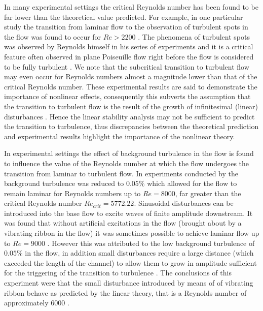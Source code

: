 \documentclass[a4paper, 12pt, twoside, openright]{article}
\numberwithin{equation}{section}
\begin{document}
In many experimental settings the critical Reynolds number has been found to be far lower than the theoretical value predicted. For example, in one particular study the transition from laminar flow to the observation of turbulent spots in the flow was found to occur for $Re>2200$ \citep{Alavyoon_etal86}. The phenomena of turbulent spots was observed by Reynolds himself in his series of experiments and it is a critical feature often observed in plane Poiseuille flow right before the flow is considered to be fully turbulent \citep{Reynolds1883}. We note that the subcritical transition to turbulent flow may even occur for Reynolds numbers almost a magnitude lower than that of the critical Reynolds number. These experimental results are said to demonstrate the importance of nonlinear effects, consequently this subverts the assumption that the transition to turbulent flow is the result of the growth of infinitesimal (linear) disturbances \citep{Alavyoon_etal86}. Hence the linear stability analysis may not be sufficient to predict the transition to turbulence, thus discrepancies between the theoretical prediction and experimental results highlight the importance of the nonlinear theory.%

In experimental settings the effect of background turbulence in the flow is found to influence the value of the Reynolds number at which the flow undergoes the transition from laminar to turbulent flow. In experiments conducted by \cite{Nishioka75} the background turbulence was reduced to $0.05\%$ which allowed for the flow to remain laminar for Reynolds numbers up to $Re=8000$, far greater than the critical Reynolds number $Re_{crit}=5772.22$. Sinusoidal disturbances can be introduced into the base flow to excite waves of finite amplitude downstream. It was found that without artificial excitations in the flow (brought about by a vibrating ribbon in the flow) it was sometimes possible to achieve laminar flow up to $Re=9000$ \citep{Nishioka75}. However this was attributed to the low background turbulence of $0.05\%$ in the flow, in addition small disturbances require a large distance (which exceeded the length of the channel) to allow them to grow in amplitude sufficient for the triggering of the transition to turbulence \citep{Nishioka75}. The conclusions of this experiment were that the small disturbance introduced by means of of vibrating ribbon behave as predicted by the linear theory, that is a Reynolds number of approximately $6000$ \citep{Nishioka75}. %
\end{document}
